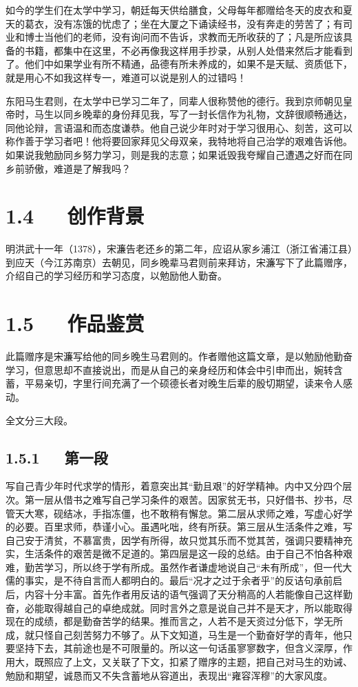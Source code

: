 \documentclass[letterpaper,12pt,english]{sphinxmanual}
\begin{document}
如今的学生们在太学中学习，朝廷每天供给膳食，父母每年都赠给冬天的皮衣和夏天的葛衣，没有冻饿的忧虑了；坐在大厦之下诵读经书，没有奔走的劳苦了；有司业和博士当他们的老师，没有询问而不告诉，求教而无所收获的了；凡是所应该具备的书籍，都集中在这里，不必再像我这样用手抄录，从别人处借来然后才能看到了。他们中如果学业有所不精通，品德有所未养成的，如果不是天赋、资质低下，就是用心不如我这样专一，难道可以说是别人的过错吗！

东阳马生君则，在太学中已学习二年了，同辈人很称赞他的德行。我到京师朝见皇帝时，马生以同乡晚辈的身份拜见我，写了一封长信作为礼物，文辞很顺畅通达，同他论辩，言语温和而态度谦恭。他自己说少年时对于学习很用心、刻苦，这可以称作善于学习者吧！他将要回家拜见父母双亲，我特地将自己治学的艰难告诉他。如果说我勉励同乡努力学习，则是我的志意；如果诋毁我夸耀自己遭遇之好而在同乡前骄傲，难道是了解我吗？


\section{1.4   创作背景}
\label{\detokenize{p01_u6563_u6587/_u5b8b_u6fc2-_u9001_u4e1c_u9633_u9a6c_u751f_u5e8f:id6}}
明洪武十一年（1378），宋濂告老还乡的第二年，应诏从家乡浦江（浙江省浦江县）到应天（今江苏南京）去朝见，同乡晚辈马君则前来拜访，宋濂写下了此篇赠序，介绍自己的学习经历和学习态度，以勉励他人勤奋。


\section{1.5   作品鉴赏}
\label{\detokenize{p01_u6563_u6587/_u5b8b_u6fc2-_u9001_u4e1c_u9633_u9a6c_u751f_u5e8f:id7}}
此篇赠序是宋濂写给他的同乡晚生马君则的。作者赠他这篇文章，是以勉励他勤奋学习，但意思却不直接说出，而是从自己的亲身经历和体会中引申而出，婉转含蓄，平易亲切，字里行间充满了一个硕德长者对晚生后辈的殷切期望，读来令人感动。

全文分三大段。


\subsection{1.5.1   第一段}
\label{\detokenize{p01_u6563_u6587/_u5b8b_u6fc2-_u9001_u4e1c_u9633_u9a6c_u751f_u5e8f:id8}}
写自己青少年时代求学的情形，着意突出其“勤且艰”的好学精神。内中又分四个层次。第一层从借书之难写自己学习条件的艰苦。因家贫无书，只好借书、抄书，尽管天大寒，砚结冰，手指冻僵，也不敢稍有懈怠。第二层从求师之难，写虚心好学的必要。百里求师，恭谨小心。虽遇叱咄，终有所获。第三层从生活条件之难，写自己安于清贫，不慕富贵，因学有所得，故只觉其乐而不觉其苦，强调只要精神充实，生活条件的艰苦是微不足道的。第四层是这一段的总结。由于自己不怕各种艰难，勤苦学习，所以终于学有所成。虽然作者谦虚地说自己“未有所成”，但一代大儒的事实，是不待自言而人都明白的。最后“况才之过于余者乎”的反诘句承前启后，内容十分丰富。首先作者用反诘的语气强调了天分稍高的人若能像自己这样勤奋，必能取得越自己的卓绝成就。同时言外之意是说自己并不是天才，所以能取得现在的成绩，都是勤奋苦学的结果。推而言之，人若不是天资过分低下，学无所成，就只怪自己刻苦努力不够了。从下文知道，马生是一个勤奋好学的青年，他只要坚持下去，其前途也是不可限量的。所以这一句话虽寥寥数字，但含义深厚，作用大，既照应了上文，又关联了下文，扣紧了赠序的主题，把自己对马生的劝诫、勉励和期望，诚恳而又不失含蓄地从容道出，表现出“雍容浑穆”的大家风度。
\end{document}

